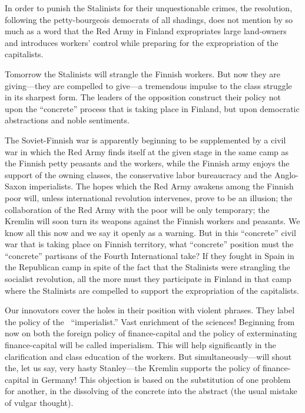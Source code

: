 In order to punish the Stalinists for their unquestionable crimes, the resolution, following the petty-bourgeois democrats of all shadings, does not mention by so much as a word that the Red Army in Finland expropriates large land-owners and introduces workers’ control while preparing for the expropriation of the capitalists.

Tomorrow the Stalinists will strangle the Finnish workers. But now they are giving---they are compelled to give---a tremendous impulse to the class struggle in its sharpest form. The leaders of the opposition construct their policy not upon the “concrete” process that is taking place in Finland, but upon democratic abstractions and noble sentiments.

The Soviet-Finnish war is apparently beginning to be supplemented by a civil war in which the Red Army finds itself at the given stage in the same camp as the Finnish petty peasants and the workers, while the Finnish army enjoys the support of the owning classes, the conservative labor bureaucracy and the Anglo-Saxon imperialists. The hopes which the Red Army awakens among the Finnish poor will, unless international revolution intervenes, prove to be an illusion; the collaboration of the Red Army with the poor will be only temporary; the Kremlin will soon turn its weapons against the Finnish workers and peasants. We know all this now and we say it openly as a warning. But in this “concrete” civil war that is taking place on Finnish territory, what “concrete” position must the “concrete” partisans of the Fourth International take? If they fought in Spain in the Republican camp in spite of the fact that the Stalinists were strangling the socialist revolution, all the more must they participate in Finland in that camp where the Stalinists are compelled to support the expropriation of the capitalists.

Our innovators cover the holes in their position with violent phrases. They label the policy of the \USSR\ “imperialist.” Vast enrichment of the sciences! Beginning from now on both the foreign policy of finance-capital and the policy of exterminating finance-capital will be called imperialism. This will help significantly in the clarification and class education of the workers. But simultaneously---will shout the, let us say, very hasty Stanley---the Kremlin supports the policy of finance-capital in Germany! This objection is based on the substitution of one problem for another, in the dissolving of the concrete into the abstract (the usual mistake of vulgar thought).

